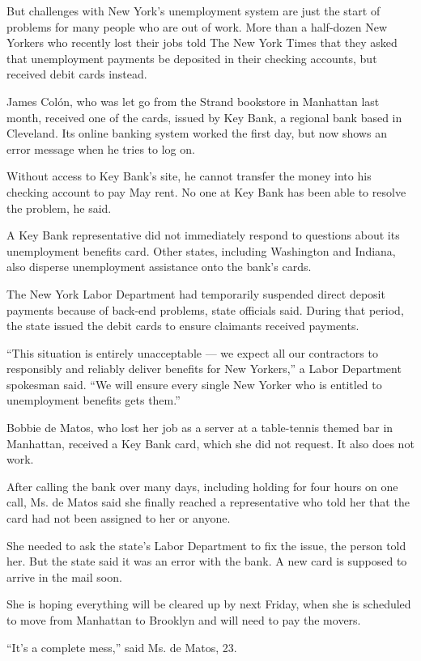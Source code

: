 But challenges with New York's unemployment system are just the start of
problems for many people who are out of work. More than a half-dozen New
Yorkers who recently lost their jobs told The New York Times that they
asked that unemployment payments be deposited in their checking
accounts, but received debit cards instead.

James Colón, who was let go from the Strand bookstore in Manhattan last
month, received one of the cards, issued by Key Bank, a regional bank
based in Cleveland. Its online banking system worked the first day, but
now shows an error message when he tries to log on.

Without access to Key Bank's site, he cannot transfer the money into his
checking account to pay May rent. No one at Key Bank has been able to
resolve the problem, he said.

A Key Bank representative did not immediately respond to questions about
its unemployment benefits card. Other states, including Washington and
Indiana, also disperse unemployment assistance onto the bank's cards.

The New York Labor Department had temporarily suspended direct deposit
payments because of back-end problems, state officials said. During that
period, the state issued the debit cards to ensure claimants received
payments.

``This situation is entirely unacceptable --- we expect all our
contractors to responsibly and reliably deliver benefits for New
Yorkers,'' a Labor Department spokesman said. ``We will ensure every
single New Yorker who is entitled to unemployment benefits gets them.''

Bobbie de Matos, who lost her job as a server at a table-tennis themed
bar in Manhattan, received a Key Bank card, which she did not request.
It also does not work.

After calling the bank over many days, including holding for four hours
on one call, Ms. de Matos said she finally reached a representative who
told her that the card had not been assigned to her or anyone.

She needed to ask the state's Labor Department to fix the issue, the
person told her. But the state said it was an error with the bank. A new
card is supposed to arrive in the mail soon.

She is hoping everything will be cleared up by next Friday, when she is
scheduled to move from Manhattan to Brooklyn and will need to pay the
movers.

``It's a complete mess,'' said Ms. de Matos, 23.

